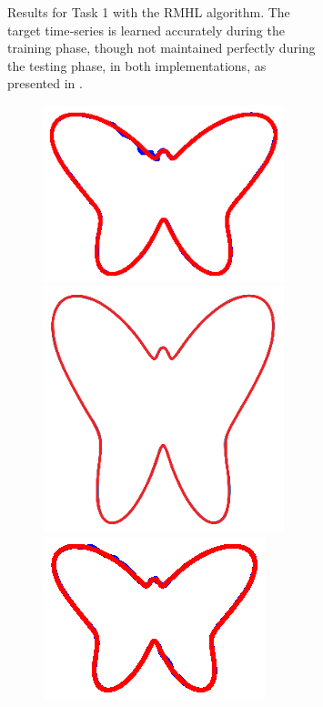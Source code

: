 \begin{figure}
\begin{subfigure}{\textwidth}
\begin{subfigure}{\textwidth}
        \end{subfigure}
        
    \caption{Results for Task 1 with the RMHL algorithm. The target time‐series is learned accurately during the training phase, though not maintained perfectly during the testing phase, in both implementations, as presented in \cite{pyle2019}.}
    \label{Fig:compTask1RMHL}
    \end{subfigure}
    
    \begin{subfigure}{\textwidth}
        \centering
        
        \textbf{}\begin{subfigure}{\textwidth}
        \centering
        
        \includegraphics[trim=3cm 4cm 3cm 4cm, clip=true,height=.1\textheight]{Figures/Fig_T1/MATLAB/ST_T1_Trajectory.eps}
        \hspace{4em}
        \includegraphics[height=.08\textheight]{Figures/Fig_T1/Orig/ST_T1_Trajectory.png}
        \hspace{4em}
        \includegraphics[trim=6cm 4.5cm 6cm 4.5cm,clip=true,height=.1\textheight]{Figures/Fig_T1/Python/ST_T1_Trajectory.eps}
        

\end{subfigure}
\end{subfigure}
\end{figure}
